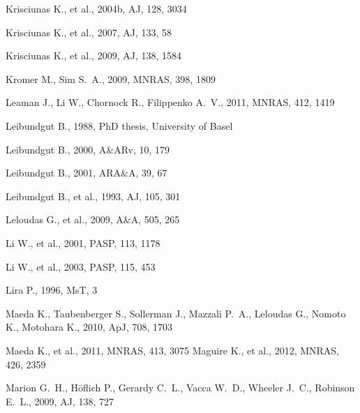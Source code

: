\begin{thebibliography}{99}
 Krisciunas K., et al., 2004b, AJ, 128, 3034 

 Krisciunas K., et al., 2007, AJ, 133, 58 

 Krisciunas K., et al., 2009, AJ, 138, 1584 

 Kromer M., Sim S.~A., 2009, MNRAS,
398, 1809 

Leaman J., Li W., Chornock R., Filippenko A.~V., 2011, MNRAS, 412, 1419 

 Leibundgut B., 1988, PhD thesis, University of Basel

 Leibundgut B., 2000, A\&ARv, 10, 179 

 Leibundgut B., 2001, ARA\&A, 39, 67 

 Leibundgut B., et al., 1993, AJ, 105,
301 

 Leloudas G., et al., 2009, A\&A, 505, 265 

 Li W., et
al., 2001, PASP, 113, 1178 

 Li W., et
al., 2003, PASP, 115, 453 

 Lira P., 
1996, MsT, 3 

Maeda K., Taubenberger S., Sollerman J., Mazzali P.~A., Leloudas G., Nomoto 
K., Motohara K., 2010, ApJ, 708, 1703 

Maeda K., et al., 2011, MNRAS, 413, 3075 
 Maguire K., et al., 2012, MNRAS, 426, 2359 

Marion G.~H., H{\"o}flich P., Gerardy C.~L., Vacca W.~D., Wheeler J.~C., 
Robinson E.~L., 2009, AJ, 138, 727 


\end{thebibliography}
